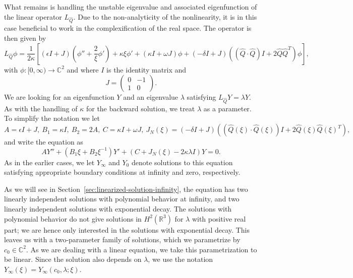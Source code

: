 \documentclass[11pt]{article}
\begin{document}
What remains is handling the unstable eigenvalue and associated
eigenfunction of the linear operator \(L_{\hat{Q}}\). Due to the
non-analyticity of the nonlinearity, it is in this case beneficial to
work in the complexification of the real space. The operator is then
given by
\begin{equation}\label{eq:L_Q-hat}
  L_{\hat{Q}}\phi = \frac{1}{2\kappa}\left[
  (\epsilon I + J)\left(\phi'' + \frac{2}{\xi}\phi'\right)
  + \kappa\xi\phi'
  + \left(\kappa I + \omega J\right)\phi
  + (-\delta I + J)((\hat{Q} \cdot \hat{Q})I + 2\hat{Q}\hat{Q}^{T})\phi
  \right],
\end{equation}
with \(\phi \colon [0, \infty) \to \mathbb{C}^{2}\) and where \(I\) is
the identity matrix and
\begin{equation*}
  J = \begin{pmatrix} 0 & -1 \\ 1 & 0 \end{pmatrix}.
\end{equation*}
We are looking for an eigenfunction \(Y\) and an eigenvalue
\(\lambda\) satisfying \(L_{\hat{Q}}Y = \lambda Y\). As with the
handling of \(\kappa\) for the backward solution, we treat
\(\lambda\) as a parameter. To simplify the notation we let
\begin{equation*}
  A = \epsilon I + J,\
  B_{1} = \kappa I,\
  B_{2} = 2A,\
  C = \kappa I + \omega J,\
  J_{N}(\xi) = (-\delta I + J)((\hat{Q}(\xi) \cdot \hat{Q}(\xi))I + 2\hat{Q}(\xi)\hat{Q}(\xi)^{T}),
\end{equation*}
and write the equation as
\begin{equation}\label{eq:Y}
  AY'' + (B_{1}\xi + B_{2}\xi^{-1})Y' + (C + J_{N}(\xi) - 2\kappa\lambda I)Y = 0.
\end{equation}
As in the earlier cases, we let \(Y_{\infty}\) and \(Y_{0}\) denote
solutions to this equation satisfying appropriate boundary conditions
at infinity and zero, respectively.

As we will see in Section~\ref{sec:linearized-solution-infinity}, the
equation has two linearly independent solutions with polynomial
behavior at infinity, and two linearly independent solutions with
exponential decay. The solutions with polynomial behavior do not give
solutions in \(H^{2}(\mathbb{R}^{3})\) for \(\lambda\) with positive
real part; we are hence only interested in the solutions with
exponential decay. This leaves us with a two-parameter family of
solutions, which we parametrize by \(c_{0} \in \mathbb{C}^{2}\). As we
are dealing with a linear equation, we take this parametrization to be
linear. Since the solution also depends on \(\lambda\), we use the
notation \(Y_{\infty}(\xi) = Y_{\infty}(c_{0}, \lambda; \xi)\).
\end{document}
